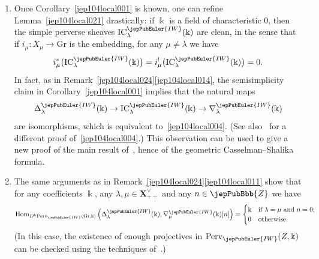 \begin{rmk}
\label{jep104local025}
\begin{enumerate}
\item
\label{jep104local013}
Once Corollary~\ref{jep104local001} is known, one can refine Lemma~\ref{jep104local021} drastically: if $\Bbbk$ is a field of characteristic $0$, then the simple perverse sheaves $\mathrm{IC}^{\jepPubEuler{IW}}_\lambda(\Bbbk)$ are clean, in the sense that if $i_\mu : X_\mu \to \mathrm{Gr}$ is the embedding, for any $\mu \neq \lambda$ we have
\begin{equation}
\label{jep104local004}
i_\mu^* \bigl( \mathrm{IC}^{\jepPubEuler{IW}}_\lambda(\Bbbk) \bigr) = i_\mu^! \bigl( \mathrm{IC}^{\jepPubEuler{IW}}_\lambda(\Bbbk) \bigr)=0.
\end{equation}
In fact, as in Remark~\ref{jep104local024}\eqref{jep104local014}, the semisimplicity claim in Corollary~\ref{jep104local001} implies that the natural maps
\[
 \Delta^{\jepPubEuler{IW}}_\lambda(\Bbbk) \to \mathrm{IC}^{\jepPubEuler{IW}}_\lambda(\Bbbk) \to \nabla^{\jepPubEuler{IW}}_\lambda(\Bbbk)
\]
are isomorphisms, which is equivalent to~\eqref{jep104local004}.
(See also~\cite[Cor.~2.2.3]{jep104ref09} for a different proof of~\eqref{jep104local004}.)
This observation can be used to give a new proof of the main result of~\cite{jep104ref26}, hence of the geometric Casselman--Shalika formula.

\item
\label{jep104local012}
The same arguments as in Remark~\ref{jep104local024}\eqref{jep104local011} show that for any coefficients $\Bbbk$, any $\lambda,\mu \in \boldsymbol{X}^\vee_{++}$ and any $n \in \jepPubBbb{Z}$ we have
 \[
  \operatorname{Hom}_{D^{\mathrm{b}} \mathrm{Perv}_{\jepPubEuler{IW}}(\mathrm{Gr}, \Bbbk)} \left( \Delta_\lambda^{\jepPubEuler{IW}}(\Bbbk), \nabla_\mu^{\jepPubEuler{IW}}(\Bbbk)[n] \right) =
  \begin{cases}
   \Bbbk & \text{if $\lambda=\mu$ and $n=0$;} \\
   0 & \text{otherwise.}
  \end{cases}
 \]
 (In this case, the existence of enough projectives in $\mathrm{Perv}_{\jepPubEuler{IW}}(Z,\Bbbk)$ can be checked using the techniques of~\cite[\S 2]{jep104ref41}.)
\end{enumerate}
\end{rmk}

